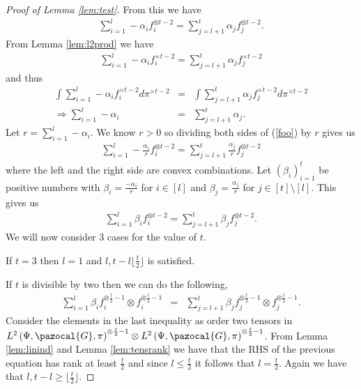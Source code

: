 \documentclass[aos,preprint]{imsart}
\def\sG{\pazocal{G}}
\theoremstyle{plain}
\theoremstyle{defintion}
\begin{document}
\begin{proof}[Proof of Lemma \ref{lem:test}]
		From this we have 
		\begin{eqnarray}\label{foo}
			\sum_{i=1}^{l}-\alpha_i f_i^{\otimes t-2}=\sum_{j=l+1}^{t}\alpha_j f_j^{\otimes t-2}.
		\end{eqnarray}
		From Lemma \ref{lem:l2prod} we have
		\begin{eqnarray*}
			\sum_{i=1}^{l}-\alpha_i f_i^{\times t-2}=\sum_{j=l+1}^{t}\alpha_j f_j^{\times t-2}
		\end{eqnarray*}
		and thus
		\begin{eqnarray*}
			\int \sum_{i=1}^{l}-\alpha_i f_i^{\times t-2} d\pi^{\times t-2 }&=&\int \sum_{j=l+1}^{t}\alpha_j f_j^{\times t-2}d\pi^{\times t-2 }\\
			\Rightarrow \sum_{i=1}^{l}-\alpha_i &=&\sum_{j=l+1}^{t}\alpha_j.
		\end{eqnarray*}
		Let $r=\sum_{i=1}^{l}-\alpha_i$. We know $r >0$ so dividing both sides of (\ref{foo}) by $r$ gives us
		\begin{eqnarray*}
			\sum_{i=1}^{l}-\frac{\alpha_i}{r} f_i^{\otimes t-2}=\sum_{j=l+1}^{t}\frac{\alpha_j}{r} f_j^{\otimes t-2}
		\end{eqnarray*}
		where the left and the right side are convex combinations. Let $\left( \beta_i \right)_{i=1}^{t}$ be positive numbers with $\beta_i = \frac{-\alpha_i}{r}$ for $i \in \left[ l \right]$ and $\beta_j = \frac{\alpha_j}{r}$ for $j\in \left[ t \right] \setminus \left[ l \right]$. This gives us
		\begin{eqnarray} \label{eqn:noidenttens}
			\sum_{i=1}^{l}\beta_i f_i^{\otimes t-2}=\sum_{j=l+1}^{t}\beta_j f_j^{\otimes t-2}.
		\end{eqnarray}
		We will now consider 3 cases for the value of $t$.

		If $t=3$ then $l=1$ and $l,t-l \lfloor\frac{t}{2}\rfloor$ is satisfied.

		If $t$ is divisible by two then we can do the following,
		\begin{eqnarray*}
			\sum_{i=1}^{l} \beta_i f_i^{\otimes \frac{t}{2}-1}\otimes f_i^{\otimes \frac{t}{2}-1}&=&\sum_{j=l+1}^{t}\beta_j f_j^{\otimes \frac{t}{2}-1}\otimes f_j^{\otimes \frac{t}{2}-1}.
		\end{eqnarray*}
		\sloppy Consider the elements in the last inequality as order two tensors in $ {L^2\left( \Psi, \sG, \pi \right)}^{\otimes \frac{t}{2}-1} \otimes  {L^2\left( \Psi, \sG, \pi \right)}^{ \otimes \frac{t}{2}-1} $. From Lemma \ref{lem:linind} and Lemma \ref{lem:tensrank} we have that the RHS of the previous equation has rank at least $\frac{t}{2}$ and since $l\le \frac{t}{2}$ it follows that $l=\frac{t}{2}$. Again we have that $l,t-l \ge\lfloor \frac{t}{2}\rfloor$.


\end{proof}
\end{document}
